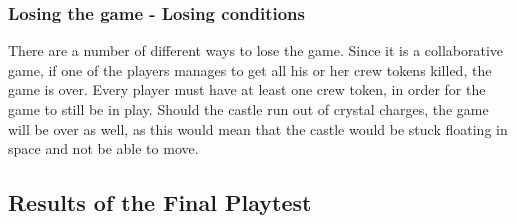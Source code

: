 \subsubsection{Losing the game - Losing conditions}
There are a number of different ways to lose the game. Since it is a collaborative game, if one of the players manages to get all his or her crew tokens killed, the game is over. Every player must have at least one crew token, in order for the game to still be in play.
Should the castle run out of crystal charges, the game will be over as well, as this would mean that the castle would be stuck floating in space and not be able to move.

\subsection{Results of the Final Playtest}

